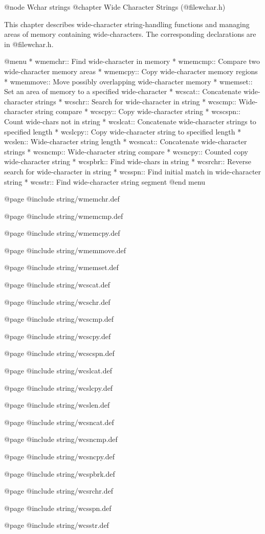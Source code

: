 @node Wchar strings
@chapter Wide Character Strings (@file{wchar.h})

This chapter describes wide-character string-handling functions and
managing areas of memory containing wide-characters.  The corresponding 
declarations are in @file{wchar.h}.

@menu
* wmemchr::     Find wide-character in memory
* wmemcmp::     Compare two wide-character memory areas
* wmemcpy::     Copy wide-character memory regions
* wmemmove::    Move possibly overlapping wide-character memory
* wmemset::     Set an area of memory to a specified wide-character
* wcscat::      Concatenate wide-character strings
* wcschr::      Search for wide-character in string
* wcscmp::      Wide-character string compare
* wcscpy::      Copy wide-character string
* wcscspn::     Count wide-chars not in string
* wcslcat::     Concatenate wide-character strings to specified length
* wcslcpy::     Copy wide-character string to specified length
* wcslen::      Wide-character string length
* wcsncat::     Concatenate wide-character strings
* wcsncmp::     Wide-character string compare
* wcsncpy::     Counted copy wide-character string
* wcspbrk::     Find wide-chars in string
* wcsrchr::     Reverse search for wide-character in string
* wcsspn::      Find initial match in wide-character string
* wcsstr::      Find wide-character string segment
@end menu

@page
@include string/wmemchr.def

@page
@include string/wmemcmp.def

@page
@include string/wmemcpy.def

@page
@include string/wmemmove.def

@page
@include string/wmemset.def

@page
@include string/wcscat.def

@page
@include string/wcschr.def

@page
@include string/wcscmp.def

@page
@include string/wcscpy.def

@page
@include string/wcscspn.def

@page
@include string/wcslcat.def

@page
@include string/wcslcpy.def

@page
@include string/wcslen.def

@page
@include string/wcsncat.def

@page
@include string/wcsncmp.def

@page
@include string/wcsncpy.def

@page
@include string/wcspbrk.def

@page
@include string/wcsrchr.def

@page
@include string/wcsspn.def

@page
@include string/wcsstr.def

